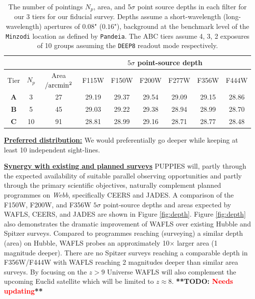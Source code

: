 \documentclass[12pt]{article}
\newcommand{\todo}[1]{\textbf{**TODO: \textcolor{red}{#1}**}}
\begin{document}
\begin{table}[h!]
\footnotesize
\begin{center}
\begin{tabular}{ |c|c|c|c|c|c|c|c|c| } 
\hline
\multicolumn{3}{|c|}{} & \multicolumn{6}{|c|}{$5\sigma$ point-source depth} \\
 \hline
Tier & $N_{p}$ & Area$/{\rm arcmin^2}$ & F115W & F150W & F200W & F277W & F356W & F444W \\
\hline
\textbf{A} & 3 & 27 & 29.19 & 29.37 & 29.54 & 29.09 & 29.15 & 28.86 \\
\textbf{B} & 5 & 45 & 29.03 & 29.22 & 29.38 & 28.94 & 28.99 & 28.70 \\
\textbf{C} & 10 & 91 & 28.81 & 28.99 & 29.16 & 28.71 & 28.77 & 28.48 \\
\hline
\end{tabular}
\end{center}
\vspace{-5mm}
\caption{The number of pointings $N_p$, area, and 5$\sigma$ point source depths in each filter for our 3 tiers for our fiducial survey.  Depths assume a short-wavelength (long-wavelength) apertures of $0.08$" ($0.16$"), background at the benchmark level of the \texttt{Minzodi} location as defined by \texttt{Pandeia}. The ABC tiers assume 4, 3, 2 exposures of 10 groups assuming the \texttt{DEEP8} readout mode respectively.}
\end{table}

\noindent
\underline{\bf Preferred distribution:} We would preferentially go deeper while keeping at least 10 independent sight-lines. 


\noindent
\underline{\bf Synergy with existing and planned surveys} PUPPIES will, partly through the expected availability of suitable parallel observing opportunities and partly through the primary scientific objectives, naturally complement planned programmes on \emph{Webb}, specifically CEERS and JADES. A comparison of the F150W, F200W, and F356W $5\sigma$ point-source depths and areas expected by WAFLS, CEERS, and JADES are shown in Figure \ref{fig:depth}. Figure \ref{fig:depth} also demonstrates the dramatic improvement of WAFLS over existing Hubble and Spitzer surveys. Compared to programmes reaching (surveying) a similar depth (area) on Hubble, WAFLS probes an approximately 10$\times$ larger area (1 magnitude deeper). There are no Spitzer surveys reaching a comparable depth in F356W/F444W with WAFLS reaching 2 magnitudes deeper than similar area surveys. By focusing on the $z>9$ Universe WAFLS will also complement the upcoming Euclid satellite which will be limited to $z\approx 8$. \todo{Needs updating}
\end{document}
